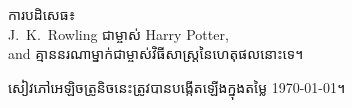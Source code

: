 \newpage
\vspace*{4cm}
\begin{center}
ការបដិសេធ៖\\J.~K.~Rowling ជាម្ចាស់ Harry Potter,\\and គ្មាននរណាម្នាក់ជាម្ចាស់វិធីសាស្រ្តនៃហេតុផលនោះទេ។
\end{center}

\vfill
សៀវភៅអេឡិចត្រូនិចនេះត្រូវបានបង្កើតឡើងក្នុងតម្លៃ \today{}។
